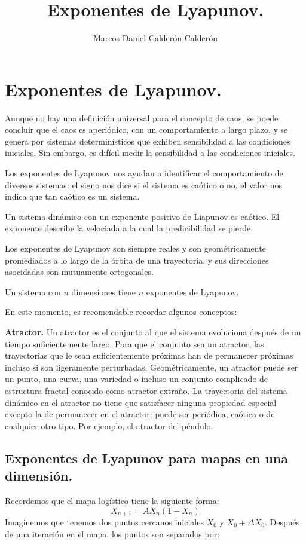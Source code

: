 \documentclass[prodmode,acmtap]{acmlarge}
\title{Exponentes de Lyapunov.}
\author{Marcos Daniel Calderón Calderón \affil{CIMAT}
}
\begin{document}
\maketitle

\section{Exponentes de Lyapunov.}
Aunque no hay una definición universal para el concepto de caos, se poede concluir que el caos es aperiódico, con un comportamiento a largo plazo, y se genera por sistemas determinísticos que exhiben sensibilidad a las condiciones iniciales. Sin embargo, es difícil medir la sensibilidad a las condiciones iniciales.

Los exponentes de Lyapunov nos ayudan a identificar el comportamiento de diversos sistemas: el signo nos dice si el sistema es caótico o no, el valor nos indica que tan caótico es un sistema.

Un sistema dinámico con un exponente positivo de Liapunov es caótico. El exponente describe la velociada a la cual la predicibilidad se pierde.

Los exponentes de Lyapunov son siempre reales y son geométricamente promediados a lo largo de la órbita de una trayectoria, y sus direcciones asocidadas son mutuamente ortogonales. 

Un sistema con $n$ dimensiones tiene $n$ exponentes de Lyapunov.

En este momento, es recomendable recordar algunos conceptos:

\textbf{Atractor.} Un atractor es el conjunto al que el sistema evoluciona después de un tiempo suficientemente largo. Para que el conjunto sea un atractor, las trayectorias que le sean suficientemente próximas han de permanecer próximas incluso si son ligeramente perturbadas. Geométricamente, un atractor puede ser un punto, una curva, una variedad o incluso un conjunto complicado de estructura fractal conocido como atractor extraño. La trayectoria del sistema dinámico en el atractor no tiene que satisfacer ninguna propiedad especial excepto la de permanecer en el atractor; puede ser periódica, caótica o de cualquier otro tipo. Por ejemplo, el atractor del péndulo.

\subsection{Exponentes de Lyapunov para mapas en una dimensión.}


Recordemos que el mapa logístico tiene la siguiente forma:
\begin{equation}
X_{n+1}= A X_{n}(1-X_{n})
\end{equation}
Imaginemos que tenemos dos puntos cercanos iniciales $X_{0}$ y $X_{0} +\Delta X_{0}$. Después de una iteración en el mapa, los puntos son separados por:
\end{document}
